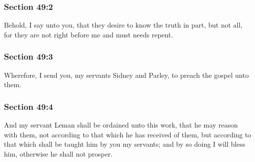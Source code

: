 	\subsubsection{Section 49:2} %
		\label{DC49-2}

		Behold, I say unto you, that they desire to know the truth in part, but not all, for they are not right before me and must needs repent.


	\subsubsection{Section 49:3} %
		\label{DC49-3}

		Wherefore, I send you, my servants Sidney and Parley, to preach the gospel unto them.


	\subsubsection{Section 49:4} %
		\label{DC49-4}

		And my servant Leman shall be ordained unto this work, that he may reason with them, not according to that which he has received of them, but according to that which shall be taught him by you my servants; and by so doing I will bless him, otherwise he shall not prosper.


